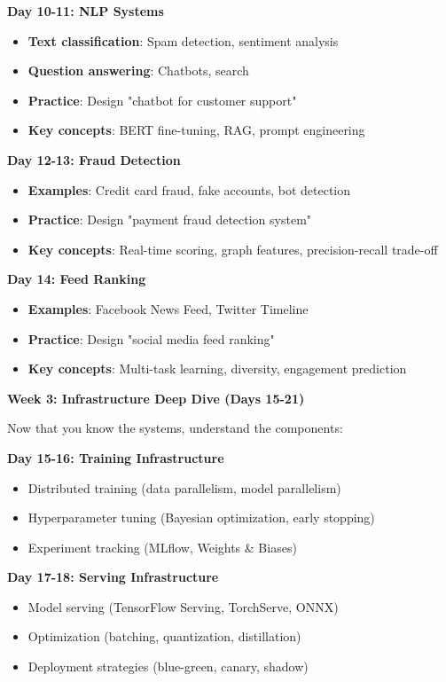 \documentclass[10pt]{article}
\begin{document}
\textbf{Day 10-11: NLP Systems}
\begin{itemize}
\item \textbf{Text classification}: Spam detection, sentiment analysis
\item \textbf{Question answering}: Chatbots, search
\item \textbf{Practice}: Design "chatbot for customer support"
\item \textbf{Key concepts}: BERT fine-tuning, RAG, prompt engineering
\end{itemize}

\textbf{Day 12-13: Fraud Detection}
\begin{itemize}
\item \textbf{Examples}: Credit card fraud, fake accounts, bot detection
\item \textbf{Practice}: Design "payment fraud detection system"
\item \textbf{Key concepts}: Real-time scoring, graph features, precision-recall trade-off
\end{itemize}

\textbf{Day 14: Feed Ranking}
\begin{itemize}
\item \textbf{Examples}: Facebook News Feed, Twitter Timeline
\item \textbf{Practice}: Design "social media feed ranking"
\item \textbf{Key concepts}: Multi-task learning, diversity, engagement prediction
\end{itemize}

\textbf{Week 3: Infrastructure Deep Dive (Days 15-21)}

Now that you know the systems, understand the components:

\textbf{Day 15-16: Training Infrastructure}
\begin{itemize}
\item Distributed training (data parallelism, model parallelism)
\item Hyperparameter tuning (Bayesian optimization, early stopping)
\item Experiment tracking (MLflow, Weights \& Biases)
\end{itemize}

\textbf{Day 17-18: Serving Infrastructure}
\begin{itemize}
\item Model serving (TensorFlow Serving, TorchServe, ONNX)
\item Optimization (batching, quantization, distillation)
\item Deployment strategies (blue-green, canary, shadow)
\end{itemize}
\end{document}
